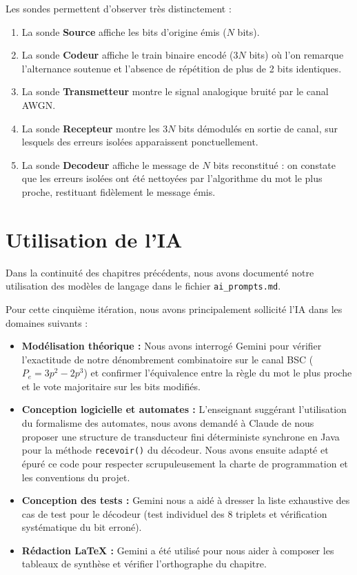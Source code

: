 \documentclass[a4paper,12pt]{report}
\begin{document}
Les sondes permettent d'observer très distinctement :
\begin{enumerate}
    \item La sonde \textbf{\og{}Source\fg{}} affiche les bits d'origine émis ($N$ bits).
    \item La sonde \textbf{\og{}Codeur\fg{}} affiche le train binaire encodé ($3N$ bits) où l'on remarque l'alternance soutenue et l'absence de répétition de plus de 2 bits identiques.
    \item La sonde \textbf{\og{}Transmetteur\fg{}} montre le signal analogique bruité par le canal AWGN.
    \item La sonde \textbf{\og{}Recepteur\fg{}} montre les $3N$ bits démodulés en sortie de canal, sur lesquels des erreurs isolées apparaissent ponctuellement.
    \item La sonde \textbf{\og{}Decodeur\fg{}} affiche le message de $N$ bits reconstitué : on constate que les erreurs isolées ont été nettoyées par l'algorithme du mot le plus proche, restituant fidèlement le message émis.
\end{enumerate}

\section{Utilisation de l'IA}

Dans la continuité des chapitres précédents, nous avons documenté notre utilisation des modèles de langage dans le fichier \verb|ai_prompts.md|.

Pour cette cinquième itération, nous avons principalement sollicité l'IA dans les domaines suivants :
\begin{itemize}
    \item \textbf{Modélisation théorique :} Nous avons interrogé Gemini pour vérifier l'exactitude de notre dénombrement combinatoire sur le canal BSC ($P_e = 3p^2 - 2p^3$) et confirmer l'équivalence entre la règle du mot le plus proche et le vote majoritaire sur les bits modifiés.
    \item \textbf{Conception logicielle et automates :} L'enseignant suggérant l'utilisation du formalisme des automates, nous avons demandé à Claude de nous proposer une structure de transducteur fini déterministe synchrone en Java pour la méthode \texttt{recevoir()} du décodeur. Nous avons ensuite adapté et épuré ce code pour respecter scrupuleusement la charte de programmation et les conventions du projet.
    \item \textbf{Conception des tests :} Gemini nous a aidé à dresser la liste exhaustive des cas de test pour le décodeur (test individuel des 8 triplets et vérification systématique du bit erroné).
    \item \textbf{Rédaction LaTeX :} Gemini a été utilisé pour nous aider à composer les tableaux de synthèse et vérifier l'orthographe du chapitre.
\end{itemize}
\end{document}
